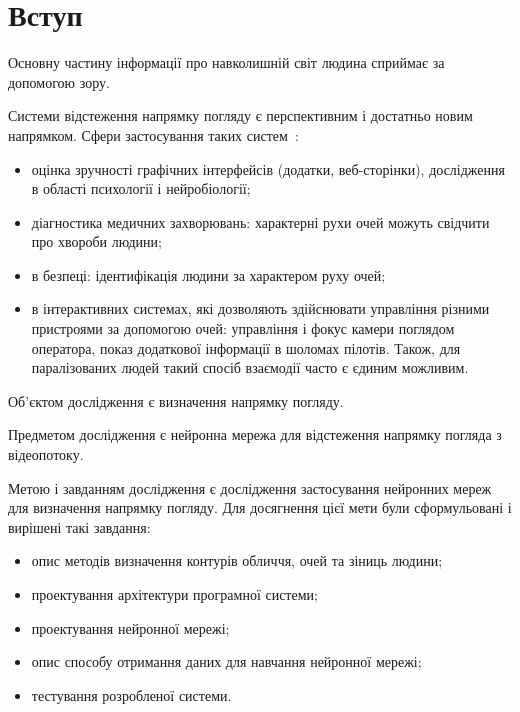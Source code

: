 \section*{Вступ}

Основну частину інформації про навколишній світ людина сприймає за допомогою зору. 

Системи відстеження напрямку погляду є перспективним і достатньо новим напрямком.
Сфери застосування таких систем~\cite{eyeControllPresentAndFuture}:
\begin{itemize}
	\item оцінка зручності графічних інтерфейсів (додатки, веб-сторінки), дослідження в області психології і нейробіології;
	\item діагностика медичних захворювань: характерні рухи очей можуть свідчити про хвороби людини;
	\item в безпеці: ідентифікація людини за характером руху очей;
 	\item в інтерактивних системах, які дозволяють здійснювати управління різними пристроями за допомогою очей: управління і фокус камери поглядом оператора, показ додаткової інформації в шоломах пілотів. Також, для паралізованих людей такий спосіб взаємодії часто є єдиним можливим.
\end{itemize}

Об'єктом дослідження є визначення напрямку погляду.

Предметом дослідження є нейронна мережа для  відстеження напрямку погляда з відеопотоку.

Метою і завданням дослідження є дослідження застосування нейронних мереж для визначення напрямку погляду.
Для досягнення цієї мети були сформульовані і вирішені такі завдання:
\begin{itemize}
	\item опис методів визначення контурів обличчя, очей та зіниць людини;
	\item проектування архітектури програмної системи;
	\item проектування нейронної мережі;
	\item опис способу отримання даних для навчання нейронної мережі;
	\item тестування розробленої системи.
\end{itemize}
